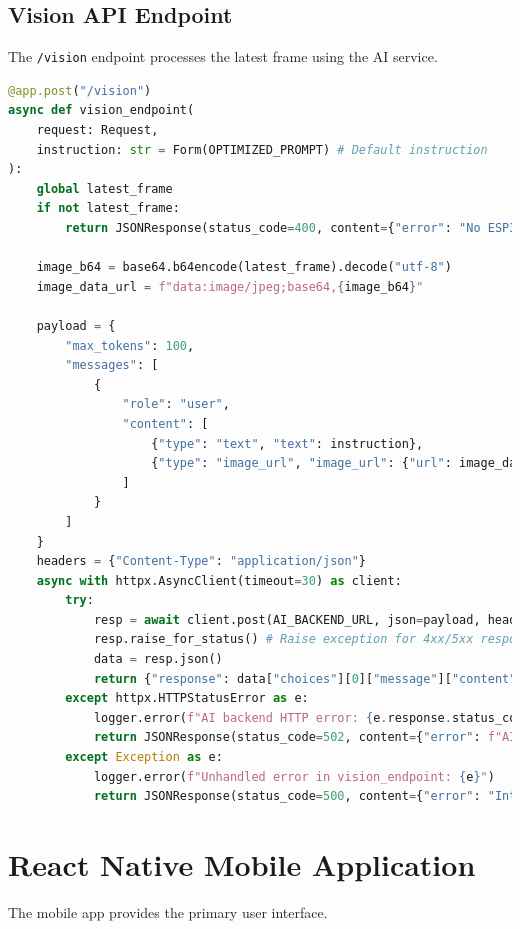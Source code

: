\documentclass[12pt, a4paper]{report}
\begin{document}
\subsection{Vision API Endpoint}
The \texttt{/vision} endpoint processes the latest frame using the AI service.
\begin{lstlisting}[language=Python, caption={FastAPI /vision Endpoint Snippet}, label={lst:fastapi_vision_ch4}] % Changed label
@app.post("/vision")
async def vision_endpoint(
    request: Request,
    instruction: str = Form(OPTIMIZED_PROMPT) # Default instruction
):
    global latest_frame
    if not latest_frame:
        return JSONResponse(status_code=400, content={"error": "No ESP32 frame available."})

    image_b64 = base64.b64encode(latest_frame).decode("utf-8")
    image_data_url = f"data:image/jpeg;base64,{image_b64}"

    payload = {
        "max_tokens": 100,
        "messages": [
            {
                "role": "user",
                "content": [
                    {"type": "text", "text": instruction},
                    {"type": "image_url", "image_url": {"url": image_data_url}}
                ]
            }
        ]
    }
    headers = {"Content-Type": "application/json"}
    async with httpx.AsyncClient(timeout=30) as client:
        try:
            resp = await client.post(AI_BACKEND_URL, json=payload, headers=headers)
            resp.raise_for_status() # Raise exception for 4xx/5xx responses
            data = resp.json()
            return {"response": data["choices"][0]["message"]["content"]}
        except httpx.HTTPStatusError as e:
            logger.error(f"AI backend HTTP error: {e.response.status_code} {e.response.text}")
            return JSONResponse(status_code=502, content={"error": f"AI backend error: {e.response.status_code}"})
        except Exception as e:
            logger.error(f"Unhandled error in vision_endpoint: {e}")
            return JSONResponse(status_code=500, content={"error": "Internal server error"})
\end{lstlisting}

\section{React Native Mobile Application}
The mobile app provides the primary user interface.
\end{document}
